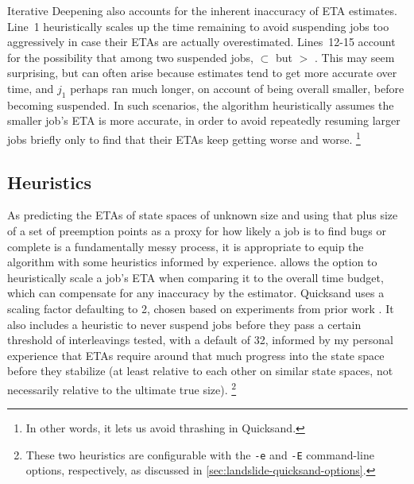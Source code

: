 Iterative Deepening also accounts for the inherent inaccuracy of ETA estimates.
Line~1 heuristically scales up the time remaining to avoid suspending jobs too aggressively
in case their ETAs are actually overestimated.
Lines~12-15 account for the
possibility that among two suspended jobs,
 $\subset$ 
but
 $>$ .
This may seem surprising,
but can often arise because estimates tend to get more accurate over time,
and $j_1$ perhaps ran much longer, on account of being overall smaller,
before becoming suspended.
In such scenarios,
the algorithm heuristically assumes the smaller job's ETA is more accurate,
in order to avoid repeatedly resuming larger jobs briefly only to find that their ETAs keep getting worse and worse.%
\footnote{In other words, it lets us avoid thrashing in Quicksand.} %


\subsection{Heuristics}
\label{sec:quicksand-heuristics}

As predicting the ETAs of state spaces of unknown size
and using that plus size of a set of preemption points as a proxy for how likely a job is to find bugs or complete
is a fundamentally messy process,
it is appropriate to equip the algorithm with some heuristics informed by experience.
 allows the option to heuristically scale a job's ETA
when comparing it to the overall time budget,
which can compensate for any inaccuracy by the estimator.
Quicksand uses a scaling factor defaulting to 2,
chosen based on experiments from prior work \cite{estimation}.
It also includes a heuristic to
never suspend jobs before they pass a certain threshold of interleavings tested,
with a default of 32,
informed by my personal experience that ETAs require around that much progress into the state space
before they stabilize (at least relative to each other on similar state spaces,
not necessarily relative to the ultimate true size).%
\footnote{These two heuristics are configurable with the
{\tt -e} and {\tt -E} command-line options, respectively,
as discussed in \cref{sec:landslide-quicksand-options}.}

